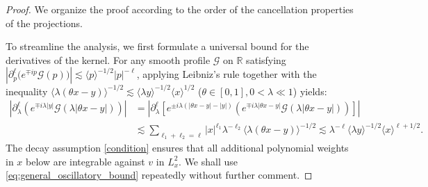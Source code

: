 \documentclass[reqno]{amsart}
\numberwithin{equation}{section}
\begin{document}
\begin{proof}
	We organize the proof according to the order of the cancellation
	properties of the projections.
	
	To streamline the  analysis, we first formulate a universal bound for the derivatives of the kernel. For any smooth profile $\mathcal{G}$ on $\mathbb{R}$ satisfying $|\partial_p^\ell \big(e^{\mp ip}\mathcal{G}(p)\big)| \lesssim \langle p \rangle^{-1/2}|p|^{-\ell}$,  applying Leibniz's rule together with the   inequality $\langle \lambda(\theta x-y) \rangle^{-1/2} \lesssim \langle \lambda y \rangle^{-1/2} \langle x \rangle^{1/2}$ ($\theta \in [0,1],  0<\lambda\ll1$) yields:
\begin{align}
	\left|\partial_\lambda^\ell \left( e^{\mp i\lambda|y|} \mathcal{G}(\lambda|\theta x-y|) \right)\right|
	&= \left|\partial_\lambda^\ell \left[ e^{\pm i\lambda(|\theta x-y|-|y|)} \left( e^{\mp i\lambda|\theta x-y|} \mathcal{G}(\lambda|\theta x-y|) \right) \right]\right| \nonumber \\
	&\lesssim \sum_{\ell_1+\ell_2=\ell} |x|^{\ell_1} \lambda^{-\ell_2} \langle \lambda(\theta x-y) \rangle^{-1/2} \lesssim \lambda^{-\ell} \langle \lambda y \rangle^{-1/2} \langle x \rangle^{\ell+1/2}. \label{eq:general_oscillatory_bound}
\end{align}
	The decay assumption \eqref{condition} ensures that all additional
	polynomial weights in $x$ below
	are integrable against $v$ in $L^2_x$. We shall use
	\eqref{eq:general_oscillatory_bound} repeatedly without further
	comment.
	
	\medskip
	

\end{proof}
\end{document}
